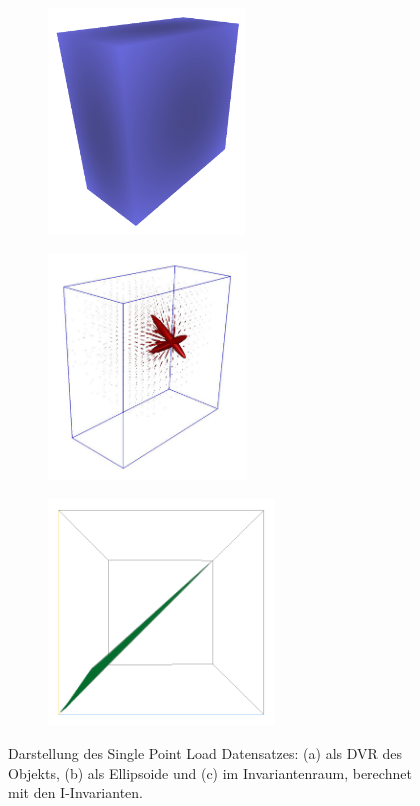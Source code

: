 \documentclass[a4paper,fontsize=12pt,toc=bib,halfparskip]{scrartcl}
\begin{document}
\begin{figure}
		\begin{subfigure}{0.3\textwidth}
		\centering
		\includegraphics[height=6cm]{pictures/results/SinglePoint/SinglePoint_Object.png}
		\subcaption{}
		\label{SinglePointObject}
	\end{subfigure}
	\hspace*{\fill}
	\begin{subfigure}{0.3\textwidth}
		\centering
		\includegraphics[height=6cm]{pictures/results/SinglePoint/SinglePoint_Ellipsoids.png}
		\subcaption{}
		\label{SinglePointEllipsoids}
	\end{subfigure}
	\hspace*{\fill}
	\begin{subfigure}{0.3\textwidth}
		\centering
		\includegraphics[height=6cm]{pictures/results/SinglePoint/SinglePoint_InvariantSpace.png}
		\subcaption{}
		\label{SinglePointInvariantSpace}
	\end{subfigure}
	\caption{Darstellung des Single Point Load Datensatzes: (a) als DVR des Objekts, (b) als Ellipsoide und (c) im Invariantenraum, berechnet mit den I-Invarianten.}
	\label{SinglePoint}
\end{figure}
\end{document}
